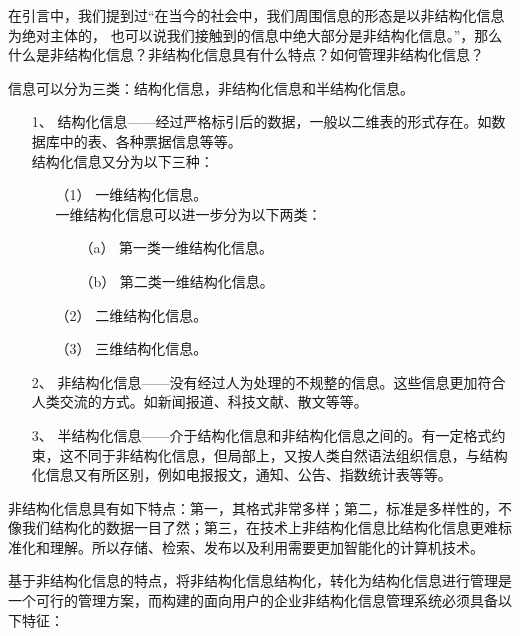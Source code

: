   


在引言中，我们提到过“在当今的社会中，我们周围信息的形态是以非结构化信息为绝对主体的， 也可以说我们接触到的信息中绝大部分是非结构化信息。”，那么什么是非结构化信息？非结构化信息具有什么特点？如何管理非结构化信息？

信息可以分为三类：结构化信息，非结构化信息和半结构化信息。

\begin{enumerate}[topsep=0pt]
  \item [1、] 结构化信息——经过严格标引后的数据，一般以二维表的形式存在。如数据库中的表、各种票据信息等等。\\ 结构化信息又分为以下三种：
  \begin{enumerate}[topsep=0pt]
    \item [（1）] 一维结构化信息。\\ 一维结构化信息可以进一步分为以下两类：
    \begin{enumerate}[topsep=0pt]
      \item [（a）] 第一类一维结构化信息。
      \item [（b）] 第二类一维结构化信息。
    \end{enumerate}
    \item [（2）]二维结构化信息。
    \item [（3）]三维结构化信息。
  \end{enumerate}
  \item [2、] 非结构化信息——没有经过人为处理的不规整的信息。这些信息更加符合人类交流的方式。如新闻报道、科技文献、散文等等。
  \item [3、] 半结构化信息——介于结构化信息和非结构化信息之间的。有一定格式约束，这不同于非结构化信息，但局部上，又按人类自然语法组织信息，与结构化信息又有所区别，例如电报报文，通知、公告、指数统计表等等。
\end{enumerate}

非结构化信息具有如下特点：第一，其格式非常多样；第二，标准是多样性的，不像我们结构化的数据一目了然；第三，在技术上非结构化信息比结构化信息更难标准化和理解。所以存储、检索、发布以及利用需要更加智能化的计算机技术。

基于非结构化信息的特点，将非结构化信息结构化，转化为结构化信息进行管理是一个可行的管理方案，而构建的面向用户的企业非结构化信息管理系统必须具备以下特征：

